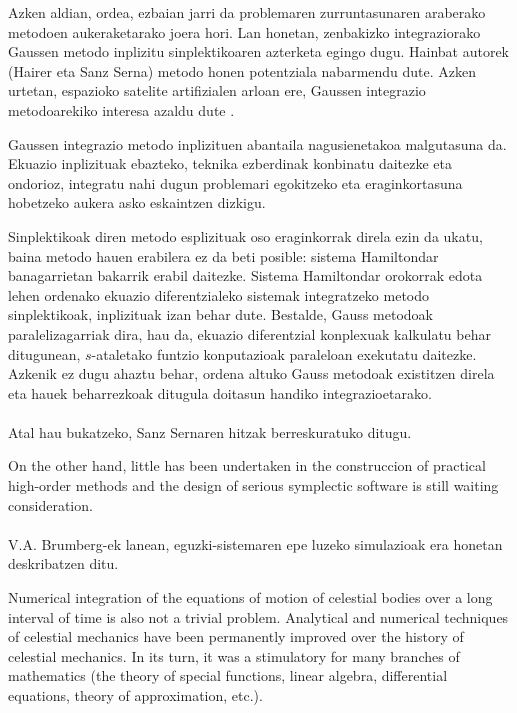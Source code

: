 Azken aldian, ordea, ezbaian jarri da problemaren zurruntasunaren araberako metodoen aukeraketarako joera hori. Lan honetan, zenbakizko integraziorako Gaussen metodo inplizitu sinplektikoaren azterketa egingo dugu. Hainbat autorek (Hairer \cite{Hairer2006,Hairer2008} eta Sanz Serna\cite{JMSanz-Serna1994}) metodo honen potentziala nabarmendu dute. Azken urtetan, espazioko satelite artifizialen arloan ere, Gaussen integrazio metodoarekiko interesa azaldu dute \cite{Bradley2014,Beylkin2014}. 

Gaussen integrazio metodo inplizituen abantaila nagusienetakoa malgutasuna da. Ekuazio inplizituak ebazteko, teknika ezberdinak konbinatu daitezke eta ondorioz, integratu nahi dugun problemari egokitzeko eta eraginkortasuna hobetzeko aukera asko eskaintzen dizkigu.

Sinplektikoak diren metodo esplizituak oso eraginkorrak direla ezin da ukatu, baina metodo hauen erabilera ez da beti posible: sistema Hamiltondar banagarrietan bakarrik erabil daitezke. Sistema Hamiltondar orokorrak edota lehen ordenako ekuazio diferentzialeko sistemak integratzeko metodo sinplektikoak, inplizituak izan behar dute. Bestalde, Gauss metodoak paralelizagarriak dira, hau da, ekuazio diferentzial konplexuak kalkulatu behar ditugunean, $s$-ataletako funtzio konputazioak paraleloan exekutatu daitezke. Azkenik ez dugu ahaztu behar, ordena altuko Gauss metodoak existitzen direla  eta hauek beharrezkoak ditugula doitasun handiko integrazioetarako.     

\paragraph*{}Atal hau bukatzeko, Sanz Sernaren  \cite[1992]{Sanz-Serna1992} hitzak berreskuratuko ditugu. 
\begin{displayquote}
On the other hand, little has been undertaken in the construccion of practical high-order methods and the design of serious symplectic software is still waiting consideration.
\end{displayquote}

\paragraph*{} V.A. Brumberg-ek \cite[2012]{Brumberg2013} lanean, eguzki-sistemaren epe luzeko simulazioak era honetan deskribatzen ditu.
\begin{displayquote}
Numerical integration of the equations of motion of celestial bodies over a long interval of time is also not a trivial problem. Analytical and numerical techniques of celestial mechanics have been permanently improved over the history of celestial mechanics. In its turn, it was a stimulatory for many branches of mathematics (the theory of special functions, linear algebra, differential equations, theory of approximation, etc.).
\end{displayquote}  

